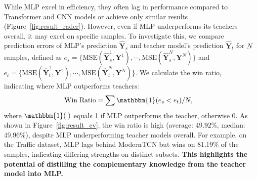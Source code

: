 

While MLP excel in efficiency, they often lag in performance compared to Transformer and CNN models or achieve only similar results (Figure~\ref{fig:result_rader}). However, even if MLP underperforms its teachers overall, it may excel on specific samples. To investigate this, we compare prediction errors of MLP's prediction $\mathbf{\hat{Y}}_s$ and teacher model's prediction $\mathbf{\hat{Y}}_t$ for $N$ samples, defined as 
$
e_s = \{\text{MSE}(\mathbf{\hat{Y}}_s^1, \mathbf{Y}^1), \cdots, \text{MSE}(\mathbf{\hat{Y}}_s^N, \mathbf{Y}^N)\}
$
and 
$
e_t = \{\text{MSE}(\mathbf{\hat{Y}}_t^1, \mathbf{Y}^1), \cdots, \text{MSE}(\mathbf{\hat{Y}}_t^N, \mathbf{Y}^N)\}.
$
We calculate the win ratio, indicating where MLP outperforms teachers:
\begin{equation}
    \text{Win Ratio} = {\sum \mathbbm{1}(e_s < e_t)}/{N},
\end{equation}
where $\mathbbm{1}(\cdot)$ equals 1 if MLP outperforms the teacher, otherwise 0. As shown in Figure~\ref{fig:result_cv}, the win ratio is high (average: 49.92\%, median: 49.96\%), despite MLP underperforming teacher models overall. For example, on the Traffic dataset, MLP lags behind ModernTCN but wins on 81.19\% of the samples, indicating differing strengths on distinct subsets. \textbf{This highlights the potential of distilling the complementary knowledge from the teacher model into MLP.}



